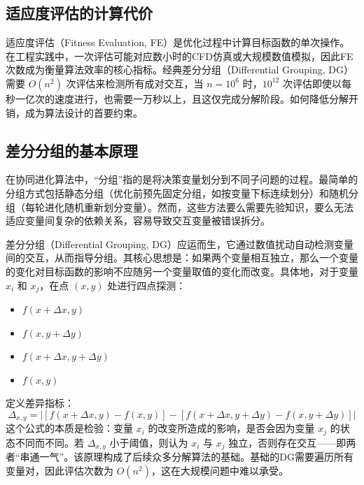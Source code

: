 \subsection{适应度评估的计算代价}
适应度评估（Fitness Evaluation, FE）是优化过程中计算目标函数的单次操作。在工程实践中，一次评估可能对应数小时的CFD仿真或大规模数值模拟，因此FE次数成为衡量算法效率的核心指标。经典差分分组（Differential Grouping, DG）需要 $O(n^2)$ 次评估来检测所有成对交互，当 $n=10^6$ 时，$10^{12}$ 次评估即使以每秒一亿次的速度进行，也需要一万秒以上，且这仅完成分解阶段。如何降低分解开销，成为算法设计的首要约束。

\subsection{差分分组的基本原理}
在协同进化算法中，“分组”指的是将决策变量划分到不同子问题的过程。最简单的分组方式包括静态分组（优化前预先固定分组，如按变量下标连续划分）和随机分组（每轮进化随机重新划分变量）。然而，这些方法要么需要先验知识，要么无法适应变量间复杂的依赖关系，容易导致交互变量被错误拆分。

差分分组（Differential Grouping, DG）应运而生，它通过数值扰动自动检测变量间的交互，从而指导分组。其核心思想是：如果两个变量相互独立，那么一个变量的变化对目标函数的影响不应随另一个变量取值的变化而改变。具体地，对于变量 $x_i$ 和 $x_j$，在点 $(x,y)$ 处进行四点探测：
\begin{itemize}
    \item $f(x+\Delta x, y)$
    \item $f(x, y+\Delta y)$
    \item $f(x+\Delta x, y+\Delta y)$
    \item $f(x, y)$
\end{itemize}
定义差异指标：
$$\Delta_{x,y} = | [f(x+\Delta x, y) - f(x,y)] - [f(x+\Delta x, y+\Delta y) - f(x, y+\Delta y)] |$$
这个公式的本质是检验：变量 $x_i$ 的改变所造成的影响，是否会因为变量 $x_j$ 的状态不同而不同。若 $\Delta_{x,y}$ 小于阈值，则认为 $x_i$ 与 $x_j$ 独立，否则存在交互——即两者“串通一气”。该原理构成了后续众多分解算法的基础。基础的DG需要遍历所有变量对，因此评估次数为 $O(n^2)$，这在大规模问题中难以承受。

